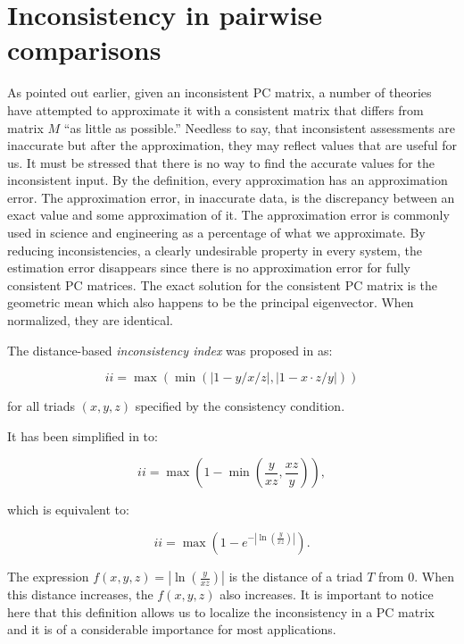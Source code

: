 \documentclass [12pt]{article}
\theoremstyle{definition}
\begin{document}
\section{Inconsistency in pairwise comparisons }
\label{sec:ic}

As pointed out earlier, given an inconsistent PC matrix, a number of theories have attempted to approximate it with a consistent matrix that differs from matrix $M$ ``as little as possible.'' 
Needless to say, that inconsistent assessments are inaccurate but after the approximation, they may reflect values that are useful for us. It must be stressed that there is no way to find the accurate values for the inconsistent input. 
By the definition, every approximation has an approximation error. The approximation error, in inaccurate data, is the discrepancy between an exact value and some approximation of it. The approximation error is commonly used in science and engineering as a percentage of what we approximate. By reducing inconsistencies, a clearly undesirable property in every system, the estimation error disappears since there is no approximation error for fully consistent PC matrices. The exact solution for the consistent PC matrix is the geometric mean which also happens to be the principal eigenvector. When normalized, they are identical.

\noindent The distance-based {\em inconsistency index} was proposed in \cite{Kocz93} as:

$$ii = \max (\min (|1-y/x/z|,|1-x\cdot z/y|))$$ 

\noindent for all triads $(x,y,z)$ specified by the consistency condition.

\noindent It has been simplified in \cite{KS2014a} to:

$$ii = \max (1-\min(\frac{y}{xz},\frac{xz}{y})),$$ 

\noindent which is equivalent to:

$$ii=\max(1- e^{-\left|\ln\left (\frac{y}{xz}\right )\right |}).$$

\noindent The expression $f(x,y,z)=|\ln(\frac{y}{xz})|$
is the distance of a triad $T$ from 0. When this distance increases, the $f(x,y,z)$ also increases. It is important to notice here that this definition allows us to localize the inconsistency in a PC matrix and it is of a considerable importance for most applications.  
\end{document}
